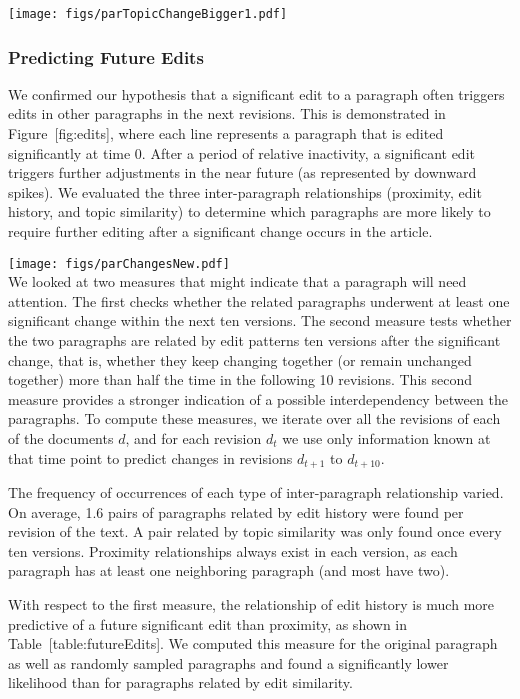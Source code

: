 \texttt{[image: figs/parTopicChangeBigger1.pdf]}\\

\subsubsection{Predicting Future Edits}\label{predicting-future-edits-1}

We confirmed our hypothesis that a significant edit to a paragraph often
triggers edits in other paragraphs in the next revisions. This is
demonstrated in Figure~{[}fig:edits{]}, where each line represents a
paragraph that is edited significantly at time 0. After a period of
relative inactivity, a significant edit triggers further adjustments in
the near future (as represented by downward spikes). We evaluated the
three inter-paragraph relationships (proximity, edit history, and topic
similarity) to determine which paragraphs are more likely to require
further editing after a significant change occurs in the article.

\texttt{[image: figs/parChangesNew.pdf]}\\

We looked at two measures that might indicate that a paragraph will need
attention. The first checks whether the related paragraphs underwent at
least one significant change within the next ten versions. The second
measure tests whether the two paragraphs are related by edit patterns
ten versions after the significant change, that is, whether they keep
changing together (or remain unchanged together) more than half the time
in the following 10 revisions. This second measure provides a stronger
indication of a possible interdependency between the paragraphs. To
compute these measures, we iterate over all the revisions of each of the
documents \(d\), and for each revision \(d_t\) we use only information
known at that time point to predict changes in revisions \(d_{t+1}\) to
\(d_{t+10}\).

The frequency of occurrences of each type of inter-paragraph
relationship varied. On average, 1.6 pairs of paragraphs related by edit
history were found per revision of the text. A pair related by topic
similarity was only found once every ten versions. Proximity
relationships always exist in each version, as each paragraph has at
least one neighboring paragraph (and most have two).

With respect to the first measure, the relationship of edit history is
much more predictive of a future significant edit than proximity, as
shown in Table~{[}table:futureEdits{]}. We computed this measure for the
original paragraph as well as randomly sampled paragraphs and found a
significantly lower likelihood than for paragraphs related by edit
similarity.

